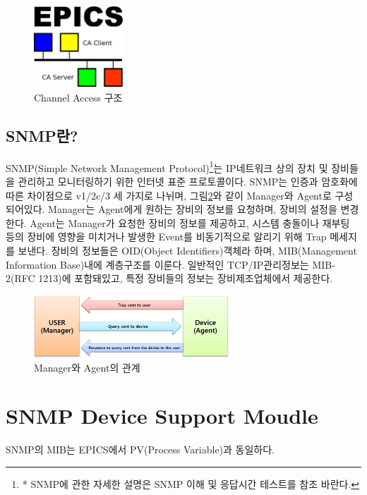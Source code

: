 \documentclass[11pt
  , a4paper
  , article
  , oneside
]{memoir}
\begin{document}
\begin{figure}[h!]
  \centering
  \includegraphics[width=0.3\textwidth]{./images/epics.eps}
  \caption{Channel Access 구조}
  \label{fig:ca}   
\end{figure}

\section{SNMP란?}
SNMP(Simple Network Management Protocol)\footnote{* SNMP에 관한 자세한 설명은 SNMP 이해 및 응답시간 테스트를 참조 바란다.}는 IP네트워크 상의 장치 및 장비들을 관리하고 모니터링하기 위한 인터넷 표준 프로토콜이다. SNMP는 인증과 암호화에 따른 차이점으로 v1/2c/3 세 가지로 나뉘며, 그림\ref{fig:relationship_m_a}와 같이 Manager와 Agent로 구성되어있다. Manager는 Agent에게 원하는 장비의 정보를 요청하며, 장비의 설정을 변경한다. Agent는 Manager가 요청한 장비의 정보를 제공하고, 시스템 충돌이나 재부팅 등의 장비에 영향을 미치거나 발생한 Event를 비동기적으로 알리기 위해 Trap 메세지를 보낸다. 장비의 정보들은 OID(Object Identifiers)객체라 하며, MIB(Management Information Base)내에 계층구조를 이룬다. 일반적인 TCP/IP관리정보는 MIB-2(RFC 1213)에 포함돼있고, 특정 장비들의 정보는 장비제조업체에서 제공한다. 

\begin{figure}[h!]
  \centering
  \includegraphics[width=0.65\textwidth]{./images/relationship_m_a.eps}
  \caption{Manager와 Agent의 관계}
  \label{fig:relationship_m_a}   
\end{figure}



\chapter{SNMP Device Support Moudle}

SNMP의 MIB는 EPICS에서 PV(Process Variable)과 동일하다. 
\end{document}
